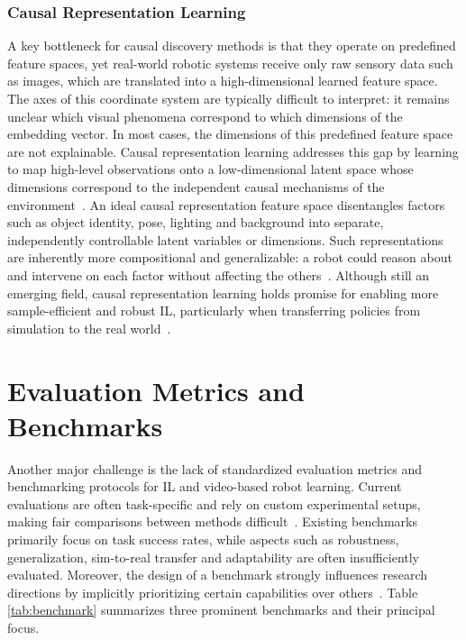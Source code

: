 \subsubsection{Causal Representation Learning}
A key bottleneck for causal discovery methods is that they operate on predefined feature spaces, yet real-world robotic systems receive only raw sensory data such as images, which are translated into a high-dimensional learned feature space. The axes of this coordinate system are typically difficult to interpret: it remains unclear which visual phenomena correspond to which dimensions of the embedding vector. In most cases, the dimensions of this predefined feature space are not explainable. Causal representation learning addresses this gap by learning to map high-level observations onto a low-dimensional latent space whose dimensions correspond to the independent causal mechanisms of the environment~\cite{CVPRWorkshopCausal, Lee2024CausalRL}. An ideal causal representation feature space disentangles factors such as object identity, pose, lighting and background into separate, independently controllable latent variables or dimensions. Such representations are inherently more compositional and generalizable: a robot could reason about and intervene on each factor without affecting the others~\cite{CVPRWorkshopCausal}. 
Although still an emerging field, causal representation learning holds promise for enabling more sample-efficient and robust \ac{IL}, particularly when transferring policies from simulation to the real world~\cite{Lee2023SCALECL, MndezMolina2022CausalDA, Castri2023FromCL}.





\section{Evaluation Metrics and Benchmarks}
Another major challenge is the lack of standardized evaluation metrics and benchmarking protocols for \ac{IL} and video-based robot learning. Current evaluations are often task-specific and rely on custom experimental setups, making fair comparisons between methods difficult~\cite{Eze2024LearningBW}.
Existing benchmarks primarily focus on task success rates, while aspects such as robustness, generalization, sim-to-real transfer and adaptability are often insufficiently evaluated. Moreover, the design of a benchmark strongly influences research directions by implicitly prioritizing certain capabilities over others~\cite{Eze2024LearningBW}. Table \ref{tab:benchmark} summarizes three prominent benchmarks and their principal focus.


